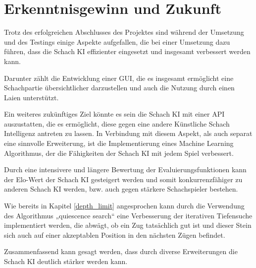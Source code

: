 \section{Erkenntnisgewinn und Zukunft}
Trotz des erfolgreichen Abschlusses des Projektes sind während der Umsetzung und des Testings einige Aspekte aufgefallen, die bei einer Umsetzung dazu führen, dass die Schach KI effizienter eingesetzt und insgesamt verbessert werden kann.

Darunter zählt die Entwicklung einer GUI, die es insgesamt ermöglicht eine Schachpartie übersichtlicher darzustellen und auch die Nutzung durch einen Laien unterstützt.

Ein weiteres zukünftiges Ziel könnte es sein die Schach KI mit einer API auszustatten, die es ermöglicht, diese gegen eine andere Künstliche Schach Intelligenz antreten zu lassen. In Verbindung mit diesem Aspekt, als auch separat eine sinnvolle Erweiterung, ist die Implementierung eines Machine Learning Algorithmus, der die Fähigkeiten der Schach KI mit jedem Spiel verbessert.

Durch eine intensivere und längere Bewertung der Evaluierungsfunktionen kann der Elo-Wert der Schach KI gesteigert werden und somit konkurrenzfähiger zu anderen Schach KI werden, bzw. auch gegen stärkere Schachspieler bestehen.

Wie bereits in Kapitel \ref{depth_limit} angesprochen kann durch die Verwendung des Algorithmus „quiescence search“ eine Verbesserung der iterativen Tiefensuche implementiert werden, die abwägt, ob ein Zug tatsächlich gut ist und dieser Stein sich auch auf einer akzeptablen Position in den nächsten Zügen befindet.

Zusammenfassend kann gesagt werden, dass durch diverse Erweiterungen die Schach KI deutlich stärker werden kann.